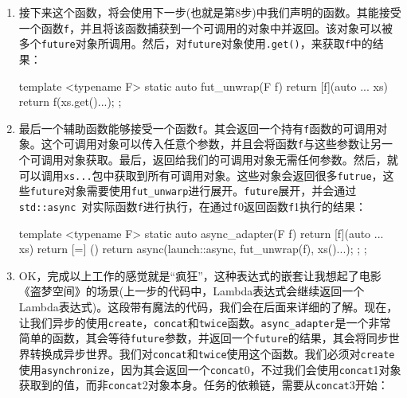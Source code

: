 \begin{enumerate}
\begin{codebox}[cpp]
template <typename F>
static auto asynchronize(F f)
{
    return [f](auto ... xs) {
        return [=] () {
            return async(launch::async, f, xs...);
        };
    };
} 
\end{codebox}

\item 接下来这个函数，将会使用下一步(也就是第8步)中我们声明的函数。其能接受一个函数\texttt{f}，并且将该函数捕获到一个可调用的对象中并返回。该对象可以被多个\texttt{future}对象所调用。然后，对\texttt{future}对象使用\texttt{.get()}，来获取\texttt{f}中的结果：

\begin{codebox}[cpp]
template <typename F>
static auto fut_unwrap(F f)
{
    return [f](auto ... xs) {
        return f(xs.get()...);
    };
}
\end{codebox}

\item 最后一个辅助函数能够接受一个函数\texttt{f}。其会返回一个持有\texttt{f}函数的可调用对象。这个可调用对象可以传入任意个参数，并且会将函数\texttt{f}与这些参数让另一个可调用对象获取。最后，返回给我们的可调用对象无需任何参数。然后，就可以调用\texttt{xs...}包中获取到所有可调用对象。这些对象会返回很多\texttt{futrue}，这些\texttt{future}对象需要使用\texttt{fut\_unwarp}进行展开。\texttt{future}展开，并会通过\texttt{std::async }对实际函数\texttt{f}进行执行，在通过\texttt{f}0返回函数\texttt{f}1执行的结果：

\begin{codebox}[cpp]
template <typename F>
static auto async_adapter(F f)
{
    return [f](auto ... xs) {
        return [=] () {
            return async(launch::async,
                        fut_unwrap(f), xs()...);
        };
    };
}
\end{codebox}

\item OK，完成以上工作的感觉就是“疯狂”，这种表达式的嵌套让我想起了电影《盗梦空间》的场景(上一步的代码中，Lambda表达式会继续返回一个Lambda表达式)。这段带有魔法的代码，我们会在后面来详细的了解。现在，让我们异步的使用\texttt{create}，\texttt{concat}和\texttt{twice}函数。\texttt{async\_adapter}是一个非常简单的函数，其会等待\texttt{future}参数，并返回一个\texttt{future}的结果，其会将同步世界转换成异步世界。我们对\texttt{concat}和\texttt{twice}使用这个函数。我们必须对\texttt{create}使用\texttt{asynchronize}，因为其会返回一个\texttt{concat}0，不过我们会使用\texttt{concat}1对象获取到的值，而非\texttt{concat}2对象本身。任务的依赖链，需要从\texttt{concat}3开始：


\end{enumerate}
